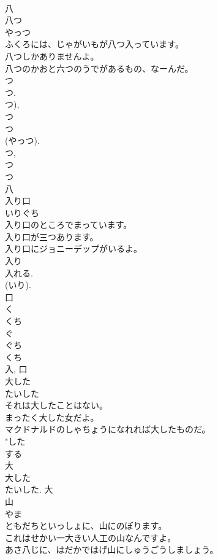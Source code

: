 \documentclass[8pt]{extreport}
\begin{document}
\begin{CJK}{UTF8}{min}
\\	八	
\\	八つ	
\\	やっつ	
\\	ふくろには、じゃがいもが八つ入っています。	
\\	八つしかありませんよ。	
\\	八つのかおと六つのうでがあるもの、なーんだ。	
\\	つ 
\\	つ. 
\\	つ), 
\\	つ 
\\	つ 
\\	(やっつ). 
\\	つ, 
\\	つ 
\\	つ 
\\	八	
\\	入り口	
\\	いりぐち	
\\	入り口のところでまっています。	
\\	入り口が三つあります。	
\\	入り口にジョニーデップがいるよ。	
\\	入り 
\\	入れる. 
\\	(いり). 
\\	口 
\\	く 
\\	くち 
\\	ぐ 
\\	ぐち 
\\	くち 
\\	入, 口	
\\	大した	
\\	たいした	
\\	それは大したことはない。	
\\	まったく大した女だよ。	
\\	マクドナルドのしゃちょうになれれば大したものだ。	
\\	"した 
\\	する 
\\	大 
\\	大した 
\\	たいした.	大	
\\	山	
\\	やま	
\\	ともだちといっしょに、山にのぼります。	
\\	これはせかい一大きい人工の山なんですよ。	
\\	あさ八じに、はだかではげ山にしゅうごうしましょう。	

\end{CJK}
\end{document}
